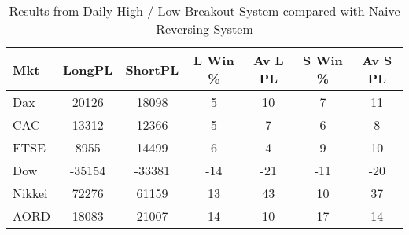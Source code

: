 \begin{table}[ht]
\centering
\caption[Daily High / Low Breakout System compared with Naive Reversing System]{Results from Daily High / Low Breakout System compared with Naive Reversing System} 
\label{tab:hl_bout_sys_diff}
\begin{tabular}{lcccccc}
  \toprule Mkt & LongPL & ShortPL & L Win \% & Av L PL & S Win \% & Av S PL \\ 
  \midrule Dax & 20126 & 18098 & 5 & 10 & 7 & 11 \\ 
  CAC & 13312 & 12366 & 5 & 7 & 6 & 8 \\ 
  FTSE & 8955 & 14499 & 6 & 4 & 9 & 10 \\ 
  Dow & -35154 & -33381 & -14 & -21 & -11 & -20 \\ 
  Nikkei & 72276 & 61159 & 13 & 43 & 10 & 37 \\ 
  AORD & 18083 & 21007 & 14 & 10 & 17 & 14 \\ 
   \bottomrule \end{tabular}
\end{table}
